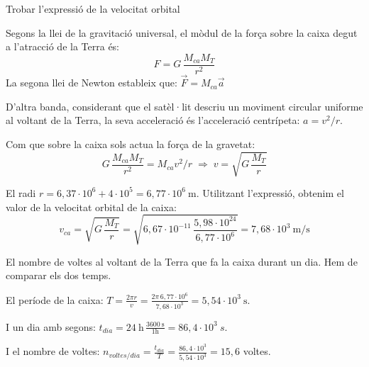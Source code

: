 \begin{solapartat}
Trobar l'expressió de la velocitat orbital

 Segons la llei de la gravitació universal, el mòdul de la força sobre la caixa degut a l'atracció de la Terra és:
\[ F = G\,\frac{M_{ca}M_T}{r^2} \]
La segona llei de Newton estableix que: $\vec{F} = M_{ca}\vec{a}$

D'altra banda, considerant que el satèl·lit descriu un moviment circular uniforme al voltant de la Terra, la seva acceleració és l'acceleració centrípeta: $a = v^2/r$.

Com que sobre la caixa sols actua la força de la gravetat:
\[ G\,\frac{M_{ca}M_T}{r^2} = M_{ca}v^2/r \;\Rightarrow\; v = \sqrt{G\,\frac{M_T}{r}} \]

 El radi $r = 6,37\cdot 10^{6} + 4\cdot 10^{5} = 6,77\cdot 10^{6}\ \mathrm{m}$. Utilitzant l'expressió, obtenim el valor de la velocitat orbital de la caixa:
\[ v_{ca} = \sqrt{G\,\frac{M_T}{r}} = \sqrt{6,67\cdot 10^{-11}\,\frac{5,98\cdot 10^{24}}{6,77\cdot 10^{6}}} = 7,68\cdot 10^{3}\ \mathrm{m/s} \]

 El nombre de voltes al voltant de la Terra que fa la caixa durant un dia. Hem de comparar els dos temps.

El període de la caixa: $T = \frac{2\pi r}{v} = \frac{2\pi\, 6,77\cdot 10^{6}}{7,68\cdot 10^{3}} = 5,54\cdot 10^{3}\ \mathrm{s}$.

I un dia amb segons: $t_{dia} = 24\ \mathrm{h}\,\frac{3600\ \mathrm{s}}{1\mathrm{h}} = 86,4\cdot 10^{3}\ s$.

I el nombre de voltes: $n_{voltes/dia} = \frac{t_{dia}}{T} = \frac{86,4\cdot 10^{3}}{5,54\cdot 10^{3}} = 15,6$ voltes.
\end{solapartat}

